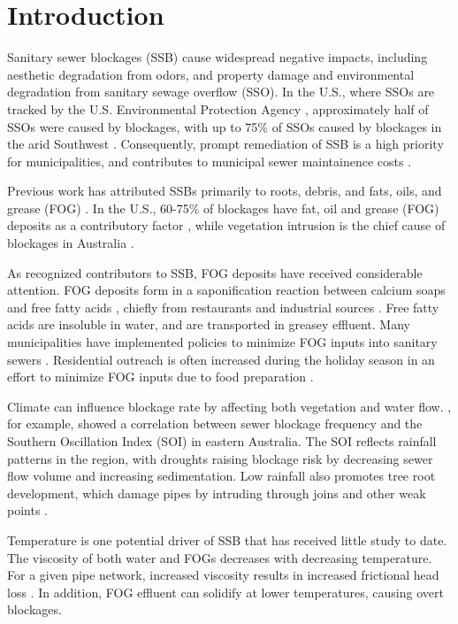 \section{Introduction}
Sanitary sewer blockages (SSB) cause widespread negative impacts, including
aesthetic degradation from odors, and property damage and environmental
degradation from sanitary sewage overflow (SSO).  In the U.S., where SSOs are
tracked by the U.S. Environmental Protection Agency \parencite{epa2004local},
approximately half of SSOs were caused by blockages, with up to 75\% of SSOs
caused by blockages in the arid Southwest \parencite{epa2004report}.
Consequently, prompt remediation of SSB is a high priority for municipalities,
and contributes to municipal sewer maintainence costs
\parencite{maintainence-cost}.

Previous work has attributed SSBs primarily to roots, debris, and fats, oils,
and grease (FOG) \parencite{epa2004report}.  In the U.S., 60-75\% of blockages
have fat, oil and grease (FOG) deposits as a contributory factor
\parencite{Keener2008}, while vegetation intrusion is the chief cause of
blockages in Australia \parencite{Marlow2011}.

As recognized contributors to SSB, FOG deposits have received considerable
attention. FOG deposits form in a saponification reaction between calcium soaps
and free fatty acids \parencite{He2011}, chiefly from restaurants and
industrial sources \parencite{Keener2008}.  Free fatty acids are insoluble in
water, and are transported in greasey effluent.  Many municipalities have
implemented policies to minimize FOG inputs into sanitary sewers
\parencite{hassey2001grease, heckler2003best, parnell2005innovative,
bennett2006atlanta, tupper2008fog}.  Residential outreach is often increased
during the holiday season in an effort to minimize FOG inputs due to food
preparation \parencite{tupper2008fog}.

Climate can influence blockage rate by affecting both vegetation and water
flow. \parencite{Marlow2011}, for example, showed a correlation between sewer
blockage frequency and the Southern Oscillation Index (SOI) in eastern
Australia. The SOI reflects rainfall patterns in the region, with droughts
raising blockage risk by decreasing sewer flow volume and increasing
sedimentation. Low rainfall also promotes tree root development, which damage
pipes by intruding through joins and other weak points \parencite{Desilva2011}.

Temperature is one potential driver of SSB that has received little study to
date. The viscosity of both water and FOGs decreases with decreasing
temperature. For a given pipe network, increased viscosity results in increased
frictional head loss . In addition, FOG effluent
can solidify at lower temperatures, causing overt blockages.

